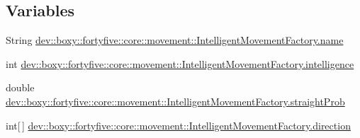 \subsection*{Variables}
\begin{DoxyCompactItemize}
\item 
String \hyperlink{group___intelligent_movement_gadc27ef2838bc9382f21b3ffc79d89404}{dev::boxy::fortyfive::core::movement::IntelligentMovementFactory.name}
\item 
int \hyperlink{group___intelligent_movement_ga9b0e82846a0b0570d87fd50d9c979968}{dev::boxy::fortyfive::core::movement::IntelligentMovementFactory.intelligence}
\item 
double \hyperlink{group___intelligent_movement_ga4cd10d785da44dfc2460c4ea999adcc1}{dev::boxy::fortyfive::core::movement::IntelligentMovementFactory.straightProb}
\item 
int\mbox{[}$\,$\mbox{]} \hyperlink{group___intelligent_movement_ga6b8b74cf3c1bd96c164971c71ce7a2ca}{dev::boxy::fortyfive::core::movement::IntelligentMovementFactory.direction}
\end{DoxyCompactItemize}


